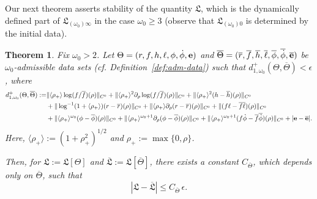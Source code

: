 \documentclass[10pt, reqno]{amsart}
\newtheorem{theorem}{Theorem}[section]
\theoremstyle{definition}
\theoremstyle{remark}
\numberwithin{equation}{section}
\newcommand{\nrm}[1]{\Vert#1\Vert}
\newcommand{\brk}[1]{\langle#1\rangle}
\newcommand{\set}[1]{\{#1\}}
\newcommand{\rd}{\partial}
\newcommand{\0}{\emptyset}
\newcommand{\eps}{\epsilon}
\newcommand{\Tht}{\Theta}
\newcommand{\omg}{\omega}
\newcommand{\bfe}{{\bf e}}
\newcommand{\e}{\bfe}							%
\newcommand{\phibg}{\overline{\phi}}				%
\newcommand{\rbg}{\overline{r}}					%
\newcommand{\ebg}{\overline{\e}}					%
\newcommand{\fbg}{\overline{f}}
\newcommand{\hbg}{\overline{h}}
\newcommand{\ellbg}{\overline{\ell}}
\newcommand{\dphibg}{\overline{\dot{\phi}}}
\newcommand{\Abs}[1]{\left\vert #1 \right\vert}
\newcommand{\Nrm}[1]{\left\Vert #1 \right\Vert}
\begin{document}
Our next theorem asserts stability of the quantity $\mathfrak{L}$, which is the dynamically defined part of $\mathfrak{L}_{(\omg_{0}) \infty}$ in the case $\omg_{0} \geq 3$ (observe that $\mathfrak{L}_{(\omg_{0}) 0}$ is determined by the initial data). 
\begin{theorem} \label{thm:L-stability}
Fix $\omg_0>2$. Let $\Tht = (r, f, h, \ell, \phi, \dot{\phi}, \e)$ and $\overline{\Tht} = (\rbg, \fbg, \hbg, \ellbg, \phibg, \dphibg, \ebg)$ be $\omg_0$-admissible data sets (cf. Definition~\ref{def:adm-data}) such that $d_{1, \omg_0}^{+}(\Tht, \overline{\Tht}) < \eps$, where 
\begin{equation*}
\begin{aligned}
	d_{1, \omg_0}^{+} (\Tht, \overline{\Tht}) := 
	& \nrm{\brk{\rho_{+}} \log (f / \fbg)(\rho)}_{C^{0}} 
	+ \nrm{\brk{\rho_{+}}^{2} \rd_{\rho} \log (f / \fbg)(\rho)}_{C^{0}} 
	+ \nrm{\brk{\rho_{+}}^{2}  (h - \hbg) (\rho)}_{C^{0}} \\
	& + \nrm{\log^{-1}(1+\brk{\rho_{+}}) (r - \rbg)(\rho)}_{C^{0}} 
	+ \nrm{\brk{\rho_{+}} \rd_{\rho} (r - \rbg)(\rho)}_{C^{0}} 
	+ \nrm{( f \ell - \overline{f}\overline{ \ell})(\rho)}_{C^{0}}  \\
	& + \nrm{\brk{\rho_{+}}^{\omg_0} (\phi - \phibg)(\rho)}_{C^{0}} 
	+ \nrm{\brk{\rho_{+}}^{\omg_0+1} \rd_{\rho} (\phi- \phibg)(\rho)}_{C^{0}} 
	+ \nrm{\brk{\rho_{+}}^{\omg_0+1} (f \dot{\phi} - \overline{f} \overline{\dot{\phi}})(\rho)}_{C^{0}} 
	+ |{\bf e} - \ebg|.
\end{aligned}
\end{equation*}
Here, $\brk{\rho_{+}} := (1 + \rho_{+}^{2})^{1/2}$ and $\rho_{+} := \max\set{0, \rho}$.

Then, for $\mathfrak L:=\mathfrak L[\Tht]$ and $\overline{\mathfrak L}:=\mathfrak L[\overline{\Tht}]$, there exists a constant $C_{\overline{\Tht}}$, which depends only on $\overline{\Tht}$, such that
\begin{equation*}
	\Abs{\mathfrak{L} - \overline{\mathfrak{L}}} \leq C_{\overline{\Tht}} \, \eps.
\end{equation*}
\end{theorem}
\end{document}
